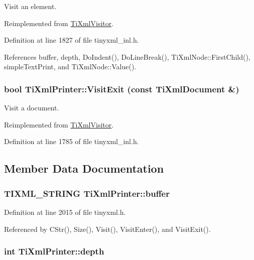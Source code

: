 Visit an element. 

Reimplemented from \hyperlink{class_ti_xml_visitor_aec2b1f8116226d52f3a1b95dafd3a32c}{TiXmlVisitor}.

Definition at line 1827 of file tinyxml\_\-inl.h.

References buffer, depth, DoIndent(), DoLineBreak(), TiXmlNode::FirstChild(), simpleTextPrint, and TiXmlNode::Value().\hypertarget{class_ti_xml_printer_a0a636046fa589b6d7f3e5bd025b3f33e}{
\subsubsection[{VisitExit}]{\setlength{\rightskip}{0pt plus 5cm}bool TiXmlPrinter::VisitExit (const {\bf TiXmlDocument} \&)}}
\label{class_ti_xml_printer_a0a636046fa589b6d7f3e5bd025b3f33e}


Visit a document. 

Reimplemented from \hyperlink{class_ti_xml_visitor_aa0ade4f27087447e93974e975c3246ad}{TiXmlVisitor}.

Definition at line 1785 of file tinyxml\_\-inl.h.

\subsection{Member Data Documentation}
\hypertarget{class_ti_xml_printer_ae6cc56c79e52ef352ecc612809fdbedf}{
\subsubsection[{buffer}]{\setlength{\rightskip}{0pt plus 5cm}TIXML\_\-STRING {\bf TiXmlPrinter::buffer}}}
\label{class_ti_xml_printer_ae6cc56c79e52ef352ecc612809fdbedf}


Definition at line 2015 of file tinyxml.h.

Referenced by CStr(), Size(), Visit(), VisitEnter(), and VisitExit().\hypertarget{class_ti_xml_printer_a7e11330449daea912320c22f84387df7}{
\subsubsection[{depth}]{\setlength{\rightskip}{0pt plus 5cm}int {\bf TiXmlPrinter::depth}}}
\label{class_ti_xml_printer_a7e11330449daea912320c22f84387df7}


